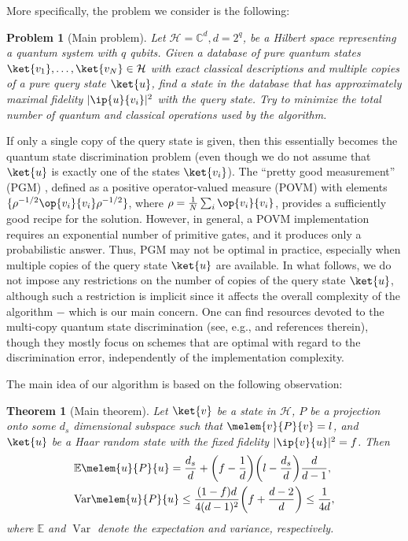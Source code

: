 \documentclass[pra,twocolumn,superscriptaddress,longbibliography]{revtex4-2}
\newtheorem{theorem}{Theorem}
\newtheorem{problem}{Problem}
\theoremstyle{remark}
\newcommand{\mcl}{\mathcal}
\newcommand{\mbb}{\mathbb}
\DeclareMathOperator{\var}{\mathrm{Var}}
\numberwithin{equation}{section}
\begin{document}
More specifically, the problem we consider is the following: 

\begin{problem}[Main problem] \label{prob:main}
Let $\mcl{H} = \mbb{C}^d, d = {2^q}$, be a Hilbert space representing a quantum system with $q$ qubits.
Given a database of pure quantum states $\ket{v_1}, \dots, \ket{v_N} \in \mcl{H}$ with exact classical descriptions
and multiple copies of a pure query state $\ket{u}$, 
find a state in the database that has approximately maximal fidelity $|\ip{u}{v_i}|^2$ with the query state. 
Try to minimize the total number of quantum and classical operations used by the algorithm.
\end{problem}

If only a single copy of the query state is given, then this essentially becomes the quantum state discrimination problem 
(even though we do not assume that $\ket{u}$ is exactly one of the states $\ket{v_i}$). 
The ``pretty good measurement'' (PGM) \cite{PGM1994, PGM2007}, defined as a positive operator-valued measure (POVM) with elements 
$\{\rho^{-1/2}\op{v_i}{v_i}\rho^{-1/2}\}$, where $\rho = \frac{1}{N}\sum_i\op{v_i}{v_i}$, 
provides a sufficiently good recipe for the solution. 
However, in general, a POVM implementation requires an exponential number of primitive gates, and it produces only a probabilistic answer.
Thus, PGM may not be optimal in practice, especially when multiple copies of the query state $\ket{u}$ are available. 
In what follows, we do not impose any restrictions on the number of copies of the query state $\ket{u}$, 
although such a restriction is implicit since it affects the overall complexity of the algorithm $-$ which is our main concern.
One can find resources devoted to the multi-copy quantum state discrimination 
(see, e.g., \cite{MQSD2019} and references therein), 
though they mostly focus on schemes that are optimal with regard to the discrimination error, 
independently of the implementation complexity. 

The main idea of our algorithm is based on the following observation:

\begin{theorem}[Main theorem] \label{thm:main}
Let $\ket{v}$ be a state in $\mcl{H}$, 
$P$ be a projection onto some $d_s$ dimensional subspace 
such that $\melem{v}{P}{v} = l$, 
and $\ket{u}$ be a Haar random state with the fixed fidelity $|\ip{v}{u}|^2 = f$. Then 
\begin{align}
& {\mbb{E}} \melem{u}{P}{u} = \frac{d_s}{d} + \bigg(f - \frac{1}{d}\bigg)\bigg(l - \frac{d_s}{d}\bigg)\frac{d}{d-1}, \\
& {\var} \melem{u}{P}{u} \le  \frac{(1-f)d}{4(d-1)^2}\bigg( f + \frac{d - 2}{d}\bigg) \le \frac{1}{4d}, 
\end{align}
where $\mbb{E}$ and $\var$ denote the expectation and variance, respectively.
\end{theorem}
\end{document}
